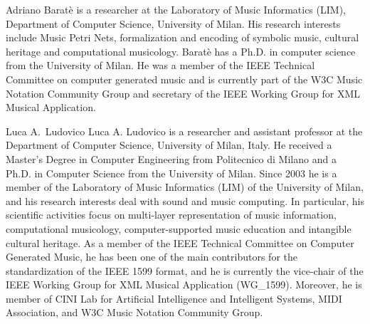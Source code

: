 \documentclass[10pt,journal,compsoc]{IEEEtran}
\begin{document}
\begin{IEEEbiography}{Adriano Barat\`{e}} is a researcher at the Laboratory of Music Informatics (LIM), Department of Computer Science, University of Milan. His research interests include Music Petri Nets, formalization and encoding of symbolic music, cultural heritage and computational musicology. Baratè has a Ph.D. in computer science from the University of Milan. He was a member of the IEEE Technical Committee on computer generated music and is currently part of the W3C Music Notation Community Group and secretary of the IEEE Working Group for XML Musical Application.
\end{IEEEbiography}

\begin{IEEEbiography}{Luca A.\ Ludovico} Luca A. Ludovico is a researcher and assistant professor at the Department of Computer Science, University of Milan, Italy. He received a Master's Degree in Computer Engineering from Politecnico di Milano and a Ph.D. in Computer Science from the University of Milan. Since 2003 he is a member of the Laboratory of Music Informatics (LIM) of the University of Milan, and his research interests deal with sound and music computing. In particular, his scientific activities focus on multi-layer representation of music information, computational musicology, computer-supported music education and intangible cultural heritage. As a member of the IEEE Technical Committee on Computer Generated Music, he has been one of the main contributors for the standardization of the IEEE 1599 format, and he is currently the vice-chair of the IEEE Working Group for XML Musical Application (WG\_1599). Moreover, he is member of CINI Lab for Artificial Intelligence and Intelligent Systems, MIDI Association, and W3C Music Notation Community Group.

\end{IEEEbiography}
\end{document}
